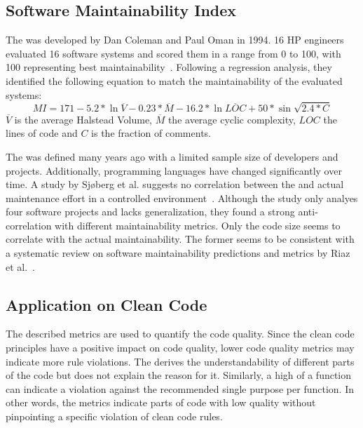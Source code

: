 \subsection{Software Maintainability Index}
The  was developed by Dan Coleman and Paul Oman in 1994. 16 HP engineers evaluated 16 software systems and scored them in a range from 0 to 100, with 100 representing best maintainability~\cite{coleman_using_1994}. 
Following a regression analysis, they identified the following equation to match the maintainability of the evaluated systems:
\begin{displaymath}
MI = 171 - 5.2 *\ln{\overline{V}} - 0.23 * \overline{M} - 16.2 * \ln{\overline{LOC}} + 50 * \sin{\sqrt{2.4 * C}}
\end{displaymath}
$\overline{V}$ is the average Halstead Volume, $\overline{M}$ the average cyclic complexity, $LOC$ the lines of code and $C$ is the fraction of comments.

The  was defined many years ago with a limited sample size of developers and projects. Additionally, programming languages have changed significantly over time. A study by Sjøberg et al. suggests no correlation between the  and actual maintenance effort in a controlled environment~\cite{sjoberg_questioning_nodate}. Although the study only analyes four software projects and lacks generalization, they found a strong anti-correlation with different maintainability metrics. Only the code size seems to correlate with the actual maintainability. The former seems to be consistent with a systematic review on software maintainability predictions and metrics by Riaz et al.~\cite{riaz_systematic_2009}.

\subsection{Application on Clean Code}
The described metrics are used to quantify the code quality. Since the clean code principles have a positive impact on code quality, lower code quality metrics may indicate more rule violations. The  derives the understandability of different parts of the code but does not explain the reason for it. Similarly, a high  of a function can indicate a violation against the recommended single purpose per function. In other words, the metrics indicate parts of code with low quality without pinpointing a specific violation of clean code rules. 


